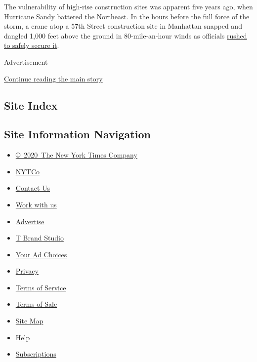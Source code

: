 The vulnerability of high-rise construction sites was apparent five
years ago, when Hurricane Sandy battered the Northeast. In the hours
before the full force of the storm, a crane atop a 57th Street
construction site in Manhattan snapped and dangled 1,000 feet above the
ground in 80-mile-an-hour winds as officials
\href{http://www.nytimes3xbfgragh.onion/2012/11/07/nyregion/drama-behind-securing-crippled-crane-in-manhattan.html}{rushed
to safely secure it}.

Advertisement

\protect\hyperlink{after-bottom}{Continue reading the main story}

\hypertarget{site-index}{%
\subsection{Site Index}\label{site-index}}

\hypertarget{site-information-navigation}{%
\subsection{Site Information
Navigation}\label{site-information-navigation}}

\begin{itemize}
\tightlist
\item
  \href{https://help.nytimes3xbfgragh.onion/hc/en-us/articles/115014792127-Copyright-notice}{©~2020~The
  New York Times Company}
\end{itemize}

\begin{itemize}
\tightlist
\item
  \href{https://www.nytco.com/}{NYTCo}
\item
  \href{https://help.nytimes3xbfgragh.onion/hc/en-us/articles/115015385887-Contact-Us}{Contact
  Us}
\item
  \href{https://www.nytco.com/careers/}{Work with us}
\item
  \href{https://nytmediakit.com/}{Advertise}
\item
  \href{http://www.tbrandstudio.com/}{T Brand Studio}
\item
  \href{https://www.nytimes3xbfgragh.onion/privacy/cookie-policy\#how-do-i-manage-trackers}{Your
  Ad Choices}
\item
  \href{https://www.nytimes3xbfgragh.onion/privacy}{Privacy}
\item
  \href{https://help.nytimes3xbfgragh.onion/hc/en-us/articles/115014893428-Terms-of-service}{Terms
  of Service}
\item
  \href{https://help.nytimes3xbfgragh.onion/hc/en-us/articles/115014893968-Terms-of-sale}{Terms
  of Sale}
\item
  \href{https://spiderbites.nytimes3xbfgragh.onion}{Site Map}
\item
  \href{https://help.nytimes3xbfgragh.onion/hc/en-us}{Help}
\item
  \href{https://www.nytimes3xbfgragh.onion/subscription?campaignId=37WXW}{Subscriptions}
\end{itemize}
